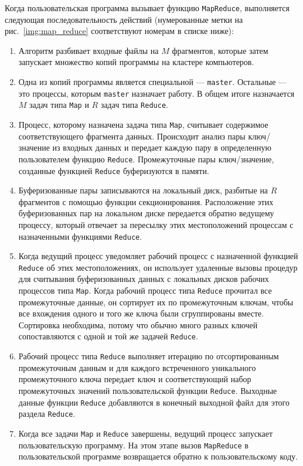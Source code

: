 
Когда пользовательская программа вызывает функцию \texttt{MapReduce}, выполняется следующая последовательность действий (нумерованные метки на рис.~\ref{img:map_reduce} соответствуют номерам в списке ниже):

\begin{enumerate}
  \item Алгоритм разбивает входные файлы на $M$ фрагментов, которые затем запускает множество копий программы на кластере компьютеров.
  \item Одна из копий программы является специальной --- \texttt{master}. 
    Остальные --- это процессы, которым \texttt{master} назначает работу. 
    В общем итоге назначается $M$ задач типа \texttt{Map} и $R$ задач типа \texttt{Reduce}.
  \item Процесс, которому назначена задача типа \texttt{Map}, считывает содержимое соответствующего фрагмента данных.
    Происходит анализ пары ключ/значение из входных данных и передает каждую пару в определенную пользователем функцию \texttt{Reduce}. 
    Промежуточные пары ключ/значение, созданные функцией \texttt{Reduce} буферизуются в памяти.
  \item Буферизованные пары записываются на локальный диск, разбитые на $R$ фрагментов с помощью функции секционирования.
    Расположение этих буферизованных пар на локальном диске передается обратно ведущему процессу, который отвечает за пересылку этих местоположений процессам с назначенными функциями \texttt{Reduce}.
  \item Когда ведущий процесс уведомляет рабочий процесс с назначенной функцией \texttt{Reduce} об этих местоположениях, он использует удаленные вызовы процедур для считывания буферизованных данных с локальных дисков рабочих процессов типа \texttt{Map}.
    Когда рабочий процесс типа \texttt{Reduce} прочитал все промежуточные данные, он сортирует их по промежуточным ключам, чтобы все вхождения одного и того же ключа были сгруппированы вместе. 
    Сортировка необходима, потому что обычно много разных ключей сопоставляются с одной и той же задачей \texttt{Reduce}. 
  \item Рабочий процесс типа \texttt{Reduce} выполняет итерацию по отсортированным промежуточным данным и для каждого встреченного уникального промежуточного ключа передает ключ и соответствующий набор промежуточных значений пользовательской функции \texttt{Reduce}.
    Выходные данные функции \texttt{Reduce} добавляются в конечный выходной файл для этого раздела \texttt{Reduce}.
  \item Когда все задачи \texttt{Map} и \texttt{Reduce} завершены, ведущий процесс запускает пользовательскую программу. 
    На этом этапе вызов \texttt{MapReduce} в пользовательской программе возвращается обратно к пользовательскому коду.
\end{enumerate}

